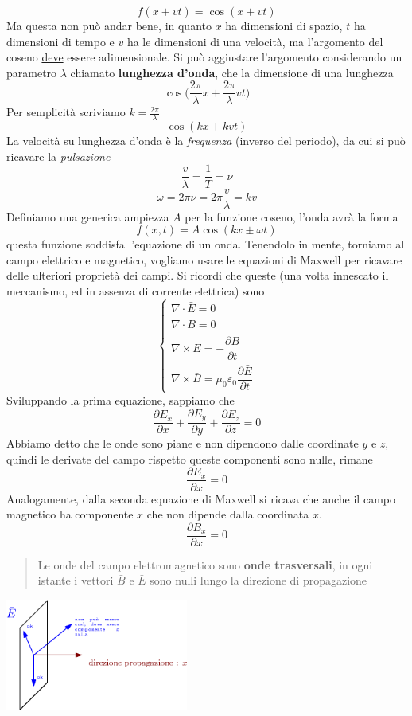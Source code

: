 \documentclass[10pt, letterpaper]{report}
\begin{document}
$$ f(x+vt)=\cos(x+vt)$$
Ma questa non può andar bene, in quanto $x$ ha dimensioni di spazio, $t$ ha dimensioni di tempo e $v$ ha le dimensioni di una velocità, ma l'argomento del coseno \underline{deve} essere adimensionale. Si può aggiustare l'argomento considerando un parametro $\lambda$ chiamato \textbf{lunghezza d'onda}, che la dimensione di una lunghezza 
$$ 
\cos\big(\frac{2\pi}{\lambda}x+\frac{2\pi}{\lambda}vt\big)
$$
Per semplicità scriviamo $k=\frac{2\pi}{\lambda}$
$$ 
\cos(kx+kvt)
$$
La velocità su lunghezza d'onda è la \textit{frequenza} (inverso del periodo), da cui si può ricavare la \textit{pulsazione}
$$ 
\frac{v}{\lambda}=\frac{1}{T}=\nu
$$
$$ \omega = 2\pi\nu=2\pi \frac{v}{\lambda}=kv$$
Definiamo una generica ampiezza $A$ per la funzione coseno, l'onda avrà la forma 
$$ f(x,t)=
A\cos(kx\pm\omega t)
$$
questa funzione soddisfa l'equazione di un onda. Tenendolo in mente, torniamo al campo elettrico e magnetico, vogliamo usare le equazioni di Maxwell per ricavare delle ulteriori proprietà dei campi. Si ricordi che queste (una volta innescato il meccanismo, ed in assenza di corrente elettrica) sono 
$$\begin{cases}
    \nabla \cdot \bar E = 0\\ 
    \nabla \cdot \bar B = 0\\ 
    \nabla \times \bar E = -\dfrac{\partial \bar B }{\partial t}\\ 
    \nabla \times \bar B = \mu_0 \varepsilon_0 \dfrac{\partial \bar E}{\partial t}
\end{cases} $$
Sviluppando la prima equazione, sappiamo che 
$$ \frac{\partial E_x}{\partial x}+ 
\frac{\partial E_y}{\partial y}+ 
\frac{\partial E_z}{\partial z}=0$$
Abbiamo detto che le onde sono piane e non dipendono dalle coordinate $y$ e $z$, quindi le derivate del campo rispetto queste componenti sono nulle, rimane
$$ \frac{\partial E_x}{\partial x}=0$$
Analogamente, dalla seconda equazione di Maxwell si ricava che anche il campo magnetico ha componente $x$ che non dipende dalla coordinata $x$.
$$ \frac{\partial B_x}{\partial x}=0$$
\begin{quote}
    Le onde del campo elettromagnetico sono \textbf{onde trasversali}, in ogni istante i vettori $\bar B$ e $\bar E$ sono nulli lungo la direzione di propagazione
\end{quote}
\begin{center}
    \includegraphics[width=0.45\textwidth]{images/ondeTrasversali.eps}
\end{center}
\end{document}

